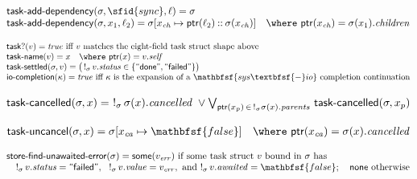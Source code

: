 \vspace{0.75em}
\noindent
$\begin{array}{@{}l@{}}
\mathsf{task\text{-}add\text{-}dependency}(\sigma, \sfid{sync}, \ell) = \sigma \\
\mathsf{task\text{-}add\text{-}dependency}(\sigma, x_1, \ell_2) = \sigma[x_{\mathit{ch}} \mapsto \mathsf{ptr}(\ell_2) \mathbin{::} \sigma(x_{\mathit{ch}})]
\quad \where\ \mathsf{ptr}(x_{\mathit{ch}}) = \sigma(x_1).\mathit{children}
\end{array}$

\vspace{0.75em}
\noindent
$\begin{array}{@{}l@{}}
\mathsf{task?}(v) = \mathit{true}\ \text{iff}\ v\ \text{matches the eight-field task struct shape above} \\
\mathsf{task\text{-}name}(v) = x \quad \where\ \mathsf{ptr}(x) = v.\mathit{self} \\
\mathsf{task\text{-}settled}(\sigma, v) = \big(\,!_{\sigma}\, v.\mathit{status} \in \{\textsf{``done''}, \textsf{``failed''}\}\big) \\
\mathsf{io\text{-}completion}(\kappa) = \mathit{true}\ \text{iff}\ \kappa\ \text{is the expansion of a}\ \mathbfsf{sys\textbfsf{-}io}\ \text{completion continuation}
\end{array}$

\vspace{0.75em}
\noindent
$\begin{array}{@{}l@{}}
\mathsf{task\text{-}cancelled}(\sigma, x) = \ !_{\sigma}\, \sigma(x).\mathit{cancelled}
  \;\lor \textstyle\bigvee_{\mathsf{ptr}(x_p)\, \in\, !_{\sigma} \sigma(x).\mathit{parents}}\, \mathsf{task\text{-}cancelled}(\sigma, x_p)
\end{array}$

\vspace{0.75em}
\noindent
$\begin{array}{@{}l@{}}
\mathsf{task\text{-}uncancel}(\sigma, x) = \sigma[x_{\mathit{ca}} \mapsto \mathbfsf{false}]
\quad \where\ \mathsf{ptr}(x_{\mathit{ca}}) = \sigma(x).\mathit{cancelled}
\end{array}$

\vspace{0.75em}
\noindent
$\begin{array}{@{}l@{}}
\mathsf{store\text{-}find\text{-}unawaited\text{-}error}(\sigma) = \mathsf{some}(v_{\mathit{err}})\
  \text{if some task struct}\ v\ \text{bound in}\ \sigma\ \text{has} \\
\quad !_{\sigma}\, v.\mathit{status} = \textsf{``failed''},\
  \ !_{\sigma}\, v.\mathit{value} = v_{\mathit{err}},\
  \text{and}\ !_{\sigma}\, v.\mathit{awaited} = \mathbfsf{false};\quad
  \mathsf{none}\ \text{otherwise}
\end{array}$

